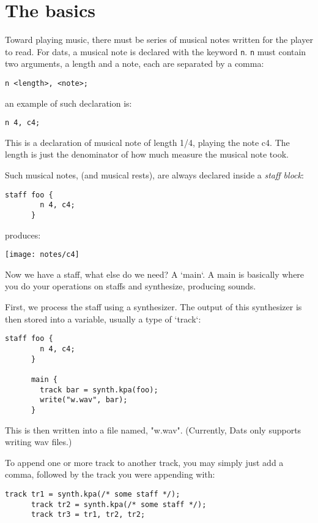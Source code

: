 \section{The basics}

\np Toward playing music, there must be series of musical notes written for the player to read.
For dats, a musical note is declared with the keyword \verb+n+. \verb+n+ must contain two arguments,
a length and a note, each are separated by a comma:


\begin{Verbatim}[frame=single]
       n <length>, <note>;
\end{Verbatim}


\np an example of such declaration is:
\begin{Verbatim}[frame=single]
       n 4, c4;
\end{Verbatim}

This is a declaration of musical note of length 1/4, playing the note c4. The length
is just the denominator of how much measure the musical note took.

\np Such musical notes, (and musical rests), are always declared inside a \textit{staff block}:

\begin{Verbatim}[frame=single]
      staff foo {
        n 4, c4;
      }
\end{Verbatim}

produces:

\begin{center}
\texttt{[image: notes/c4]}
\end{center}

\np Now we have a staff, what else do we need? A `main`. A main is basically
where you do your operations on staffs and synthesize, producing sounds.

\np First, we process the staff using a synthesizer. The output of this synthesizer
is then stored into a variable, usually a type of `track`:

\begin{Verbatim}[frame=single]
      staff foo {
        n 4, c4;
      }

      main {
        track bar = synth.kpa(foo);
        write("w.wav", bar);
      }
\end{Verbatim}

\np This is then written into a file named, "w.wav". (Currently, Dats only supports writing wav files.)

\np To append one or more track to another track, you may simply just add a comma, followed by the track
you were appending with:

\begin{Verbatim}[frame=single]
      track tr1 = synth.kpa(/* some staff */);
      track tr2 = synth.kpa(/* some staff */);
      track tr3 = tr1, tr2, tr2;
\end{Verbatim}
